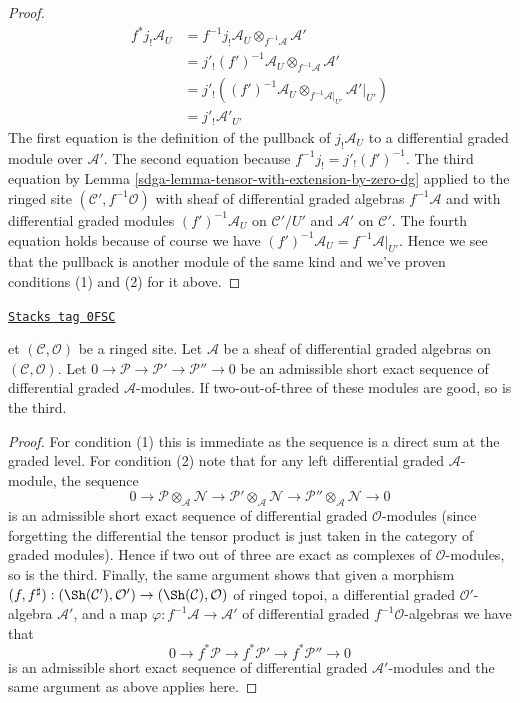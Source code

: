 \begin{proof}
\begin{align*}
f^*j_!\mathcal{A}_U
& =
f^{-1}j_!\mathcal{A}_U \otimes_{f^{-1}\mathcal{A}} \mathcal{A}' \\
& =
j'_!(f')^{-1}\mathcal{A}_U \otimes_{f^{-1}\mathcal{A}} \mathcal{A}' \\
& =
j'_!\left(
(f')^{-1}\mathcal{A}_U \otimes_{f^{-1}\mathcal{A}|_{U'}}
\mathcal{A}'|_{U'}\right) \\
& =
j'_!\mathcal{A}'_{U'}
\end{align*}
The first equation is the definition of the pullback of $j_!\mathcal{A}_U$
to a differential graded module over $\mathcal{A}'$.
The second equation because $f^{-1}j_! = j'_!(f')^{-1}$.
The third equation by Lemma \ref{sdga-lemma-tensor-with-extension-by-zero-dg}
applied to the ringed site $(\mathcal{C}', f^{-1}\mathcal{O})$ with
sheaf of differential graded algebras $f^{-1}\mathcal{A}$ and with
differential graded modules $(f')^{-1}\mathcal{A}_U$ on $\mathcal{C}'/U'$
and $\mathcal{A}'$ on $\mathcal{C}'$.
The fourth equation holds because of course we have
$(f')^{-1}\mathcal{A}_U = f^{-1}\mathcal{A}|_{U'}$.
Hence we see that the pullback is another module of the
same kind and we've proven conditions (1) and (2) for it above.
\end{proof}

\begin{lemma}
\label{sdga-lemma-good-admissible-ses}
\href{https://stacks.math.columbia.edu/tag/0FSC}{\texttt{Stacks tag 0FSC}}

et $(\mathcal{C}, \mathcal{O})$ be a ringed site.
Let $\mathcal{A}$ be a sheaf of differential graded algebras
on $(\mathcal{C}, \mathcal{O})$. Let
$0 \to \mathcal{P} \to \mathcal{P}' \to \mathcal{P}'' \to 0$
be an admissible short exact sequence of differential graded
$\mathcal{A}$-modules. If two-out-of-three of these modules
are good, so is the third.
\end{lemma}

\begin{proof}
For condition (1) this is immediate as the sequence is a direct sum
at the graded level. For condition (2) note that for any
left differential graded $\mathcal{A}$-module, the sequence
$$
0 \to
\mathcal{P} \otimes_\mathcal{A} \mathcal{N} \to
\mathcal{P}' \otimes_\mathcal{A} \mathcal{N} \to
\mathcal{P}'' \otimes_\mathcal{A} \mathcal{N} \to 0
$$
is an admissible short exact sequence of differential graded
$\mathcal{O}$-modules (since forgetting the differential
the tensor product is just taken in the category of graded modules).
Hence if two out of three are exact as complexes of $\mathcal{O}$-modules,
so is the third. Finally, the same argument shows that given
a morphism $(f, f^\sharp) : (\Sh(\mathcal{C}'), \mathcal{O}')
\to (\Sh(\mathcal{C}), \mathcal{O})$
of ringed topoi, a differential graded $\mathcal{O}'$-algebra
$\mathcal{A}'$, and a map $\varphi : f^{-1}\mathcal{A} \to \mathcal{A}'$
of differential graded $f^{-1}\mathcal{O}$-algebras
we have that
$$
0 \to f^*\mathcal{P} \to f^*\mathcal{P}' \to f^*\mathcal{P}'' \to 0
$$
is an admissible short exact sequence of differential graded
$\mathcal{A}'$-modules and the same argument as above applies here.
\end{proof}

